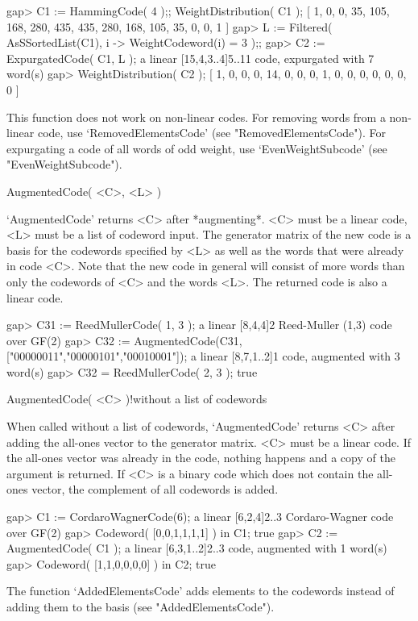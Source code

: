 \beginexample
gap> C1 := HammingCode( 4 );; WeightDistribution( C1 );
[ 1, 0, 0, 35, 105, 168, 280, 435, 435, 280, 168, 105, 35, 0, 0, 1 ]
gap> L := Filtered( AsSSortedList(C1), i -> WeightCodeword(i) = 3 );;
gap> C2 := ExpurgatedCode( C1, L );
a linear [15,4,3..4]5..11 code, expurgated with 7 word(s)
gap> WeightDistribution( C2 );
[ 1, 0, 0, 0, 14, 0, 0, 0, 1, 0, 0, 0, 0, 0, 0, 0 ] 
\endexample

This function does not work on non-linear codes.  For removing words from
a        non-linear      code,     use    `RemovedElementsCode'      (see
"RemovedElementsCode").  For  expurgating  a  code of  all words   of odd
weight, use `EvenWeightSubcode' (see "EvenWeightSubcode").

\>AugmentedCode( <C>, <L> )

`AugmentedCode'  returns <C> after  *augmenting*.  <C>  must be a  linear
code, <L> must be a list  of codeword input.  The generator matrix of the
new  code is a basis  for the codewords specified by  <L> as  well as the
words that were already in  code <C>. Note  that the new code in  general
will consist of  more words than only the  codewords of <C> and the words
<L>. The returned code is also a linear code.

\beginexample
gap> C31 := ReedMullerCode( 1, 3 );
a linear [8,4,4]2 Reed-Muller (1,3) code over GF(2)
gap> C32 := AugmentedCode(C31,["00000011","00000101","00010001"]);
a linear [8,7,1..2]1 code, augmented with 3 word(s)
gap> C32 = ReedMullerCode( 2, 3 );
true 
\endexample

\>AugmentedCode( <C> )!{without a list of codewords}

When  called without a  list   of codewords, `AugmentedCode' returns  <C>
after adding the all-ones vector  to the generator  matrix. <C> must be a
linear code.   If the  all-ones vector  was already in  the code, nothing
happens and a copy of the argument  is returned. If  <C> is a binary code
which does  not   contain the all-ones  vector,   the complement  of  all
codewords is added.

\beginexample
gap> C1 := CordaroWagnerCode(6);
a linear [6,2,4]2..3 Cordaro-Wagner code over GF(2)
gap> Codeword( [0,0,1,1,1,1] ) in C1;
true
gap> C2 := AugmentedCode( C1 );
a linear [6,3,1..2]2..3 code, augmented with 1 word(s)
gap> Codeword( [1,1,0,0,0,0] ) in C2;
true
\endexample

The function  `AddedElementsCode' adds elements  to the codewords instead
of adding them to the basis (see "AddedElementsCode").

